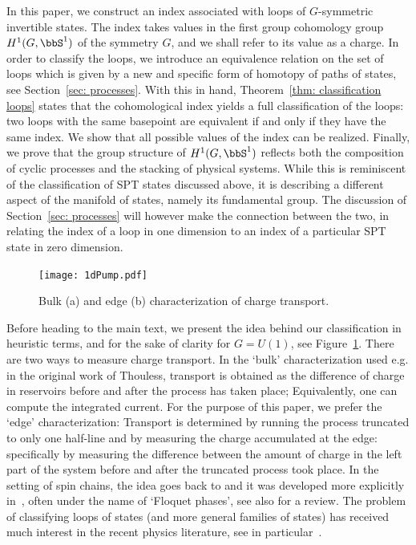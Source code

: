 In this paper, we construct an index associated with loops of $G$-symmetric invertible states. The index takes values in the first group cohomology group $H^1(G,\bbS^1)$ of the symmetry $G$, and we shall refer to its value as a charge. In order to classify the loops, we introduce an equivalence relation on the set of loops which is given by a new and specific form of homotopy of paths of states, see Section~\ref{sec: processes}. With this in hand, Theorem~\ref{thm: classification loops} states that the cohomological index yields a full classification of the loops: two loops with the same basepoint are equivalent if and only if they have the same index. We show that all possible values of the index can be realized. Finally, we prove that the group structure of $H^1(G,\bbS^1)$ reflects both the composition of cyclic processes and the stacking of physical systems. While this is reminiscent of the classification of SPT states discussed above, it is describing a different aspect of the manifold of states, namely its fundamental group. The discussion of Section~\ref{sec: processes} will however make the connection between the two, in relating the index of a loop in one dimension to an index of a particular SPT state in zero dimension. 
%
\begin{figure}[htb]
	\begin{center}
		\texttt{[image: 1dPump.pdf]}
		\caption{Bulk (a) and edge (b) characterization of charge transport.} \label{fig: edge_characterization}
	\end{center}
\end{figure} 
%

Before heading to the main text, we present the idea behind our classification in heuristic terms, and for the sake of clarity for $G=U(1)$, see Figure~\ref{fig: edge_characterization}. There are two ways to measure charge transport. In the `bulk' characterization used e.g. in the original work of Thouless, transport is obtained as the difference of charge in reservoirs before and after the process has taken place; Equivalently, one can compute the integrated current. For the purpose of this paper, we prefer the `edge' characterization: Transport is determined by running the process truncated to only one half-line and by measuring the charge accumulated at the edge: specifically by measuring the difference between the amount of charge in the left part of the system before and after the truncated process took place.  In the setting of spin chains, the idea goes back to \cite{KitaevConf} and it was developed more explicitly in~\cite{Else_2014,Else_2016,potter2016classification,von2016phase}, often under the name of `Floquet phases', see also \cite{Xiong_2018} for a review. The problem of classifying loops of states (and more general families of states) has received much interest in the recent physics literature, see in particular~\cite{KunoHatsugai,kapustin2022local,wen2021flow,aasen2022adiabatic,shiozaki2022adiabatic}. 

